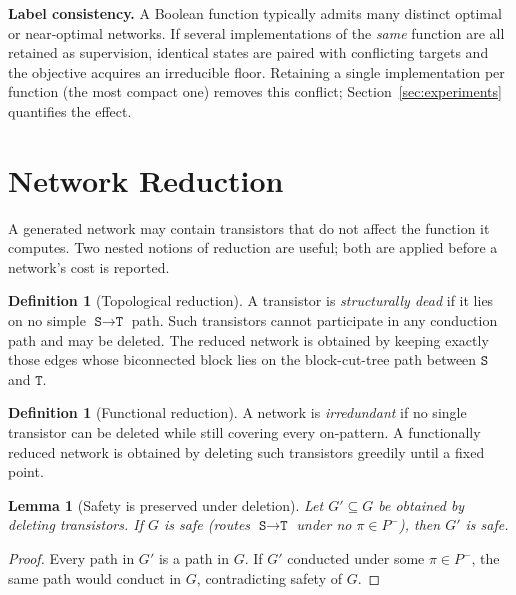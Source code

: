\documentclass[11pt, a4paper]{article}
\theoremstyle{plain}
\newtheorem{lemma}[theorem]{Lemma}
\theoremstyle{definition}
\newtheorem{definition}[theorem]{Definition}
\theoremstyle{remark}
\newcommand{\SOURCE}{\texttt{S}}
\newcommand{\SINK}{\texttt{T}}
\newcommand{\Pminus}{P^{-}}
\begin{document}
\begin{notebox}
\textbf{Label consistency.}
A Boolean function typically admits many distinct optimal or near-optimal
networks.  If several implementations of the \emph{same} function are all
retained as supervision, identical states are paired with conflicting
targets and the objective acquires an irreducible floor.  Retaining a
single implementation per function (the most compact one) removes this
conflict; Section~\ref{sec:experiments} quantifies the effect.
\end{notebox}

\section{Network Reduction}
\label{sec:reduction}

A generated network may contain transistors that do not affect the
function it computes.  Two nested notions of reduction are useful; both
are applied before a network's cost is reported.

\begin{definition}[Topological reduction]
A transistor is \emph{structurally dead} if it lies on no simple
$\SOURCE\!\to\!\SINK$ path.  Such transistors cannot participate in any
conduction path and may be deleted.  The reduced network is obtained by
keeping exactly those edges whose biconnected block lies on the
block-cut-tree path between $\SOURCE$ and $\SINK$.
\end{definition}

\begin{definition}[Functional reduction]
A network is \emph{irredundant} if no single transistor can be deleted
while still covering every on-pattern.  A functionally reduced network is
obtained by deleting such transistors greedily until a fixed point.
\end{definition}

\begin{lemma}[Safety is preserved under deletion]
\label{lem:deletion}
Let $G' \subseteq G$ be obtained by deleting transistors.  If $G$ is safe
(routes $\SOURCE\!\to\!\SINK$ under no $\pi \in \Pminus$), then $G'$ is
safe.
\end{lemma}
\begin{proof}
Every path in $G'$ is a path in $G$.  If $G'$ conducted under some
$\pi \in \Pminus$, the same path would conduct in $G$, contradicting
safety of $G$.
\end{proof}
\end{document}
